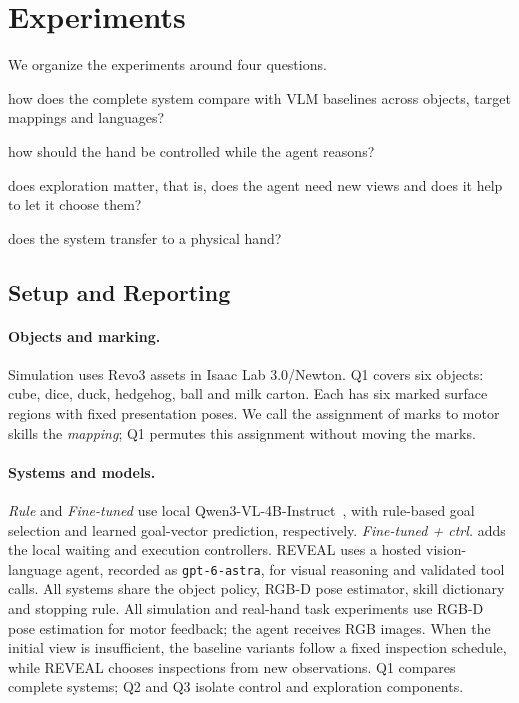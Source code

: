 \section{Experiments}
\label{sec:experiments}
We organize the experiments around four questions.
\begin{list}{}{\setlength{\leftmargin}{1.8em}\setlength{\labelwidth}{1.4em}\setlength{\labelsep}{0.4em}\setlength{\itemsep}{3pt}\setlength{\parsep}{0pt}\setlength{\topsep}{4pt}\setlength{\partopsep}{0pt}}
\item[\textbf{Q1}:] how does the complete system compare with VLM baselines across objects, target mappings and languages?
\item[\textbf{Q2}:] how should the hand be controlled while the agent reasons?
\item[\textbf{Q3}:] does exploration matter, that is, does the agent need new views and does it help to let it choose them?
\item[\textbf{Q4}:] does the system transfer to a physical hand?
\end{list}

\subsection{Setup and Reporting}
\label{sec:setup}
\paragraph{Objects and marking.}
Simulation uses Revo3 assets in Isaac Lab 3.0/Newton. Q1 covers six objects: cube, dice, duck, hedgehog, ball and milk carton. Each has six marked surface regions with fixed presentation poses. We call the assignment of marks to motor skills the \emph{mapping}; Q1 permutes this assignment without moving the marks.

\paragraph{Systems and models.}
\emph{Rule} and \emph{Fine-tuned} use local Qwen3-VL-4B-Instruct~\cite{qwen3vl}, with rule-based goal selection and learned goal-vector prediction, respectively. \emph{Fine-tuned + ctrl.} adds the local waiting and execution controllers. REVEAL uses a hosted vision-language agent, recorded as \texttt{gpt-6-astra}, for visual reasoning and validated tool calls. All systems share the object policy, RGB-D pose estimator, skill dictionary and stopping rule. All simulation and real-hand task experiments use RGB-D pose estimation for motor feedback; the agent receives RGB images. When the initial view is insufficient, the baseline variants follow a fixed inspection schedule, while REVEAL chooses inspections from new observations. Q1 compares complete systems; Q2 and Q3 isolate control and exploration components.

